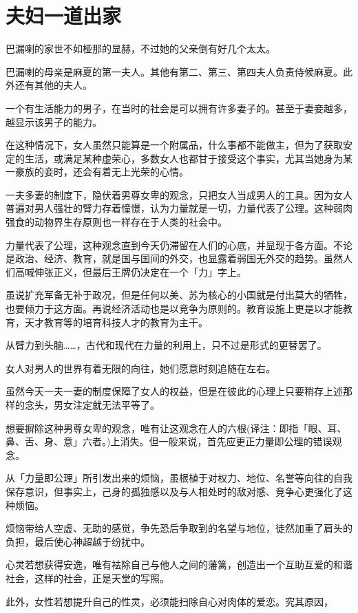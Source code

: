 \documentclass[twoside,openany]{book}
\begin{document}
\section{夫妇一道出家}\label{sec4.4}

巴漏喇的家世不如桠那的显赫，不过她的父亲倒有好几个太太。

巴漏喇的母亲是麻夏的第一夫人。其他有第二、第三、第四夫人负责侍候麻夏。此外还有其他的夫人。

一个有生活能力的男子，在当时的社会是可以拥有许多妻子的。甚至于妻妾越多，越显示该男子的能力。

在这种情况下，女人虽然只能算是一个附属品，什么事都不能做主，但为了获取安定的生活，或满足某种虚荣心，多数女人也都甘于接受这个事实，尤其当她身为某一豪族的妾时，还会有着无上光荣的心情。

一夫多妻的制度下，隐伏着男尊女卑的观念，只把女人当成男人的工具。因为女人普遍对男人强壮的臂力存着憧憬，认为力量就是一切，力量代表了公理。这种弱肉强食的动物界生存原则也一样存在于人类的社会中。

力量代表了公理，这种观念直到今天仍滞留在人们的心底，并显现于各方面。不论是政治、经济、教育，就是国与国间的外交，也显露着弱国无外交的趋势。虽然人们高喊伸张正义，但最后王牌仍决定在一个「力」字上。

虽说扩充军备无补于政况，但是任何以美、苏为核心的小国就是付出莫大的牺牲，也要倾力于这方面。再说经济活动也是以竞争为原则的。教育设施上更是以才能教育，天才教育等的培育科技人才的教育为主干。

从臂力到头脑……，古代和现代在力量的利用上，只不过是形式的更替罢了。

女人对男人的世界有着无限的向往，她们愿意时刻追随在左右。

虽然今天一夫一妻的制度保障了女人的权益，但是在彼此的心理上只要稍存上述那样的念头，男女注定就无法平等了。

想要摒除这种男尊女卑的观念，唯有让这观念在人的六根(译注：即指「眼、耳、鼻、舌、身、意」六者。)上消失。但一般来说，首先应更正力量即公理的错误观念。

从「力量即公理」所引发出来的烦恼，虽根植于对权力、地位、名誉等向往的自我保存意识，但事实上，己身的孤独感以及与人相处时的敌对感、竞争心更强化了这种烦恼。

烦恼带给人空虚、无助的感觉，争先恐后争取到的名望与地位，徒然加重了肩头的负担，最后使心神超越于纷扰中。

心灵若想获得安逸，唯有袪除自己与他人之间的藩篱，创造出一个互助互爱的和谐社会，这样的社会，正是天堂的写照。

此外，女性若想提升自己的性灵，必须能扫除自心对肉体的爱恋。究其原因，
\end{document}
